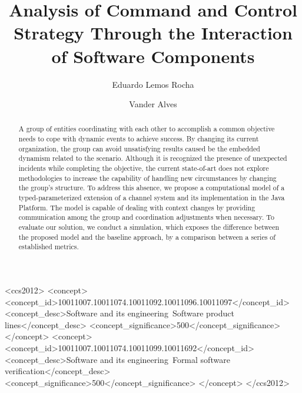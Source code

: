 \documentclass[acmsmall,colorlinks, dvipsnames]{acmart}
\begin{document}
 


\linenumbers

\title{Analysis of Command and Control Strategy Through the Interaction of Software Components}

    

\author{Eduardo Lemos Rocha}

\author{Vander Alves}


\begin{abstract}

A group of entities coordinating with each other to accomplish a common objective needs to cope with dynamic events to achieve success. By changing its current organization, the group can avoid unsatisfying results caused be the embedded dynamism related to the scenario. Although it is recognized the presence of unexpected incidents while completing the objective, the current state-of-art does not explore methodologies to increase the capability of handling new circumstances by changing the group's structure. To address this absence, we propose a computational model of a typed-parameterized extension of a channel system and its implementation in the Java Platform. The model is capable of dealing with context changes by providing communication among the group and coordination adjustments when necessary. To evaluate our solution, we conduct a simulation, which exposes the difference between the proposed model and the baseline approach, by a comparison between a series of established metrics.

\end{abstract}

\begin{CCSXML}
<ccs2012>
   <concept>
       <concept_id>10011007.10011074.10011092.10011096.10011097</concept_id>
       <concept_desc>Software and its engineering~Software product lines</concept_desc>
       <concept_significance>500</concept_significance>
       </concept>
   <concept>
       <concept_id>10011007.10011074.10011099.10011692</concept_id>
       <concept_desc>Software and its engineering~Formal software verification</concept_desc>
       <concept_significance>500</concept_significance>
       </concept>
 </ccs2012>
\end{CCSXML}
\end{document}
